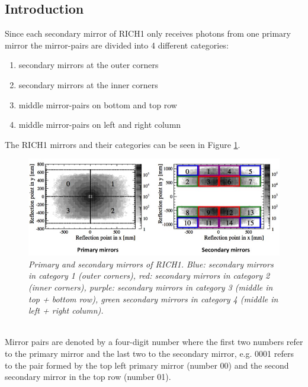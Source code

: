 \subsection{Introduction}
Since each secondary mirror of RICH1 only receives photons from one primary mirror the mirror-pairs are divided into 4 different categories:
\begin{enumerate}
\item secondary mirrors at the outer corners
\item secondary mirrors at the inner corners
\item middle mirror-pairs on bottom and top row
\item middle mirror-pairs on left and right column
\end{enumerate}
The RICH1 mirrors and their categories can be seen in Figure \ref{fig:rich1mirr}. \\
\begin{figure}[!h]
	\vspace*{-0.cm}
	\begin{center}
		\includegraphics[width=1.\textwidth]{rich1mirrors.png}
		\vspace*{-1.5cm}
	\end{center}
	\caption{\textit{Primary and secondary mirrors of RICH1. Blue: secondary mirrors in category 1 (outer corners), red: secondary mirrors in category 2 (inner corners), purple: secondary mirrors in category 3 (middle in top + bottom row), green secondary mirrors in category 4 (middle in left + right column).}}
	\label{fig:rich1mirr}
\end{figure}
\\
Mirror pairs are denoted by a four-digit number where the first two numbers refer to the primary mirror and the last two to the secondary mirror, e.g. 0001 refers to the pair formed by the top left primary mirror (number 00) and the second secondary mirror in the top row (number 01).\\

\newpage
